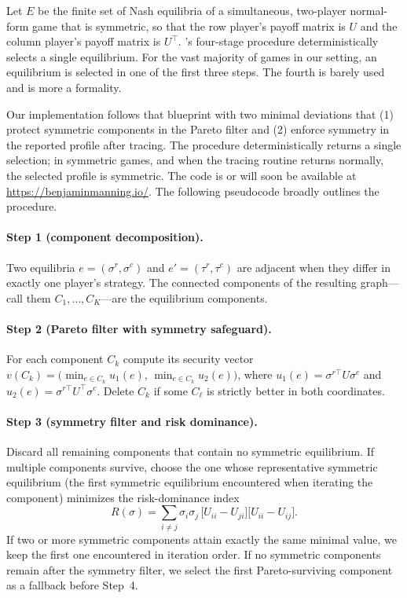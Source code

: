 \documentclass[11pt]{article}
\theoremstyle{definition}
\begin{document}
Let $E$ be the finite set of Nash equilibria of a simultaneous, two-player normal-form game that is symmetric, so that the row player's payoff matrix is $U$ and the column player's payoff matrix is $U^\top$.
\cite{HarsanyiSelten1988}'s four-stage procedure deterministically selects a single equilibrium.
For the vast majority of games in our setting, an equilibrium is selected in one of the first three steps.
The fourth is barely used and is more a formality.

Our implementation follows that blueprint with two minimal deviations that (1) protect symmetric components in the Pareto filter and (2) enforce symmetry in the reported profile after tracing.
The procedure deterministically returns a single selection; in symmetric games, and when the tracing routine returns normally, the selected profile is symmetric.
The code is or will soon be available at \url{https://benjaminmanning.io/}.
The following pseudocode broadly outlines the procedure.

\paragraph{Step 1 (component decomposition).}
Two equilibria $e=(\sigma^r,\sigma^c)$ and $e'=(\tau^r,\tau^c)$ are adjacent when they differ in exactly one player's strategy.
The connected components of the resulting graph---call them $C_1,\dots,C_K$---are the equilibrium components.

\paragraph{Step 2 (Pareto filter with symmetry safeguard).}
For each component $C_k$ compute its security vector $v(C_k)=\bigl(\min_{e\in C_k}u_1(e),\,\min_{e\in C_k}u_2(e)\bigr)$, where $u_1(e)=\sigma^{r\top}U\sigma^c$ and $u_2(e)=\sigma^{r\top}U^\top\sigma^c$.
Delete $C_k$ if some $C_\ell$ is strictly better in both coordinates. 

\paragraph{Step 3 (symmetry filter and risk dominance).}
Discard all remaining components that contain no symmetric equilibrium.
If multiple components survive, choose the one whose representative symmetric equilibrium (the first symmetric equilibrium encountered when iterating the component) minimizes the risk-dominance index
\[
R(\sigma)=\sum_{i\neq j}\sigma_i\sigma_j\,
\bigl[U_{ii}-U_{ji}\bigr]\bigl[U_{ii}-U_{ij}\bigr].
\]
If two or more symmetric components attain exactly the same minimal value, we keep the first one encountered in iteration order.
If no symmetric components remain after the symmetry filter, we select the first Pareto-surviving component as a fallback before Step~4.
\end{document}
